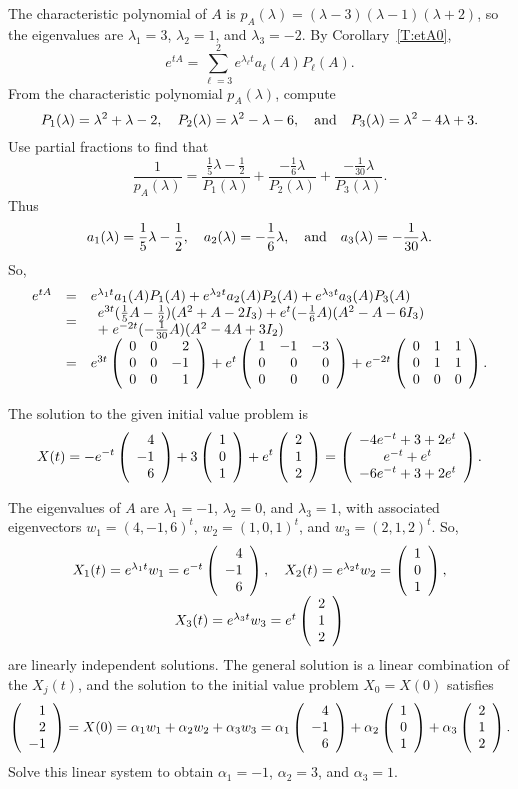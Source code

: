 \soln The characteristic polynomial of $A$ is
$p_A(\lambda) = (\lambda - 3)(\lambda - 1)(\lambda + 2)$, so the
eigenvalues are $\lambda_1 = 3$, $\lambda_2 = 1$, and $\lambda_3 = -2$.
By Corollary~\ref{T:etA0},
\[
e^{tA} = \sum_{\ell = 3}^2 e^{\lambda_\ell t}a_\ell(A)P_\ell(A).
\]
From the characteristic polynomial $p_A(\lambda)$, compute
\[
P_1(\lambda) = \lambda^2 + \lambda - 2, \quad
P_2(\lambda) = \lambda^2 - \lambda - 6, \quad\mbox{and}\quad
P_3(\lambda) = \lambda^2 - 4\lambda + 3.
\]
Use partial fractions to find that
\[
\frac{1}{p_A(\lambda)} =
\frac{\frac{1}{5}\lambda - \frac{1}{2}}{P_1(\lambda)}
+ \frac{-\frac{1}{6}\lambda}{P_2(\lambda)}
+ \frac{-\frac{1}{30}\lambda}{P_3(\lambda)}.
\]
Thus
\[
a_1(\lambda) = \frac{1}{5}\lambda - \frac{1}{2}, \quad
a_2(\lambda) = -\frac{1}{6}\lambda, \quad\mbox{and}\quad
a_3(\lambda) = -\frac{1}{30}\lambda.
\]
So,
\[
\begin{array}{rcl}
e^{tA} & = & e^{\lambda_1 t}a_1(A)P_1(A) + e^{\lambda_2 t}a_2(A)P_2(A)
+ e^{\lambda_3 t}a_3(A)P_3(A) \\
& = &
\begin{array}{l} e^{3t}(\frac{1}{5}A - \frac{1}{2})(A^2 + A - 2I_3)
+ e^t(-\frac{1}{6}A)(A^2 - A - 6I_3) \\
+\; e^{-2t}(-\frac{1}{30}A)(A^2 - 4A + 3I_2) \end{array} \\
& = & e^{3t}\left(\begin{array}{rrr} 0 & 0 & 2 \\ 0 & 0 & -1 \\ 0 & 0 & 1\end{array}\right)
+ e^t\left(\begin{array}{rrr} 1 & -1 & -3 \\ 0 & 0 & 0 \\ 0 & 0 & 0\end{array}\right)
+ e^{-2t}\left(\begin{array}{rrr} 0 & 1 & 1 \\ 0 & 1 & 1 \\ 0 & 0 & 0\end{array}\right).
\end{array}
\]

 \ans The solution to the given initial value problem is
\[
X(t) = -e^{-t}\left(\begin{array}{r} 4 \\ -1 \\ 6\end{array}\right) +
3\left(\begin{array}{r} 1 \\ 0 \\ 1\end{array}\right) + e^t\left(\begin{array}{r} 2 \\ 1 \\ 2\end{array}\right)
= \left(\begin{array}{c} -4e^{-t} + 3 + 2e^t \\ e^{-t} + e^t \\ -6e^{-t} + 3 + 2e^t\end{array}\right).
\]

\soln The eigenvalues of $A$ are $\lambda_1 = -1$, $\lambda_2 = 0$, and
$\lambda_3 = 1$, with associated eigenvectors $w_1 = (4,-1,6)^t$,
$w_2 = (1,0,1)^t$, and $w_3 = (2,1,2)^t$.  So,
\[
\begin{array}{c}
X_1(t) = e^{\lambda_1 t}w_1 = e^{-t}\left(\begin{array}{r} 4 \\ -1 \\ 6\end{array}\right), \quad
X_2(t) = e^{\lambda_2 t}w_2 = \left(\begin{array}{r} 1 \\ 0 \\ 1\end{array}\right), \\
X_3(t) = e^{\lambda_3 t}w_3 = e^t\left(\begin{array}{r} 2 \\ 1 \\ 2\end{array}\right)
\end{array}
\]
are linearly independent solutions.  The general solution is a linear
combination of the $X_j(t)$, and the solution to the initial value
problem $X_0 = X(0)$ satisfies
\[
\left(\begin{array}{r} 1 \\ 2 \\ -1\end{array}\right) = X(0) = \alpha_1w_1 + \alpha_2w_2 + \alpha_3w_3
= \alpha_1\left(\begin{array}{r} 4 \\ -1 \\ 6\end{array}\right) + \alpha_2\left(\begin{array}{r} 1 \\ 0 \\ 1\end{array}\right)
+ \alpha_3\left(\begin{array}{r} 2 \\ 1 \\ 2\end{array}\right).
\]
Solve this linear system to obtain $\alpha_1 = -1$,
$\alpha_2 = 3$, and $\alpha_3 = 1$.


